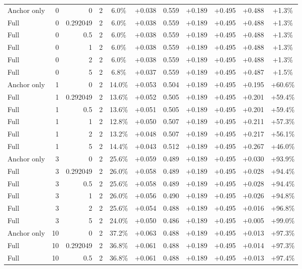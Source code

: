 \begin{table}[htbp]
\begin{tabular}{lrrrccccccc}
Anchor only & 0 & 0 & 2 & 6.0\% & +0.038 & 0.559 & +0.189 & +0.495 & +0.488 & +1.3\% \\
Full & 0 & 0.292049 & 2 & 6.0\% & +0.038 & 0.559 & +0.189 & +0.495 & +0.488 & +1.3\% \\
Full & 0 & 0.5 & 2 & 6.0\% & +0.038 & 0.559 & +0.189 & +0.495 & +0.488 & +1.3\% \\
Full & 0 & 1 & 2 & 6.0\% & +0.038 & 0.559 & +0.189 & +0.495 & +0.488 & +1.3\% \\
Full & 0 & 2 & 2 & 6.0\% & +0.038 & 0.559 & +0.189 & +0.495 & +0.488 & +1.3\% \\
Full & 0 & 5 & 2 & 6.8\% & +0.037 & 0.559 & +0.189 & +0.495 & +0.487 & +1.5\% \\
Anchor only & 1 & 0 & 2 & 14.0\% & +0.053 & 0.504 & +0.189 & +0.495 & +0.195 & +60.6\% \\
Full & 1 & 0.292049 & 2 & 13.6\% & +0.052 & 0.505 & +0.189 & +0.495 & +0.201 & +59.4\% \\
Full & 1 & 0.5 & 2 & 13.6\% & +0.051 & 0.505 & +0.189 & +0.495 & +0.201 & +59.4\% \\
Full & 1 & 1 & 2 & 12.8\% & +0.050 & 0.507 & +0.189 & +0.495 & +0.211 & +57.3\% \\
Full & 1 & 2 & 2 & 13.2\% & +0.048 & 0.507 & +0.189 & +0.495 & +0.217 & +56.1\% \\
Full & 1 & 5 & 2 & 14.4\% & +0.043 & 0.512 & +0.189 & +0.495 & +0.267 & +46.0\% \\
Anchor only & 3 & 0 & 2 & 25.6\% & +0.059 & 0.489 & +0.189 & +0.495 & +0.030 & +93.9\% \\
Full & 3 & 0.292049 & 2 & 26.0\% & +0.058 & 0.489 & +0.189 & +0.495 & +0.028 & +94.4\% \\
Full & 3 & 0.5 & 2 & 25.6\% & +0.058 & 0.489 & +0.189 & +0.495 & +0.028 & +94.4\% \\
Full & 3 & 1 & 2 & 26.0\% & +0.056 & 0.490 & +0.189 & +0.495 & +0.026 & +94.8\% \\
Full & 3 & 2 & 2 & 25.6\% & +0.054 & 0.488 & +0.189 & +0.495 & +0.016 & +96.8\% \\
Full & 3 & 5 & 2 & 24.0\% & +0.050 & 0.486 & +0.189 & +0.495 & +0.005 & +99.0\% \\
Anchor only & 10 & 0 & 2 & 37.2\% & +0.063 & 0.488 & +0.189 & +0.495 & +0.013 & +97.3\% \\
Full & 10 & 0.292049 & 2 & 36.8\% & +0.061 & 0.488 & +0.189 & +0.495 & +0.014 & +97.3\% \\
Full & 10 & 0.5 & 2 & 36.8\% & +0.061 & 0.488 & +0.189 & +0.495 & +0.013 & +97.4\% \\

\end{tabular}
\end{table}
